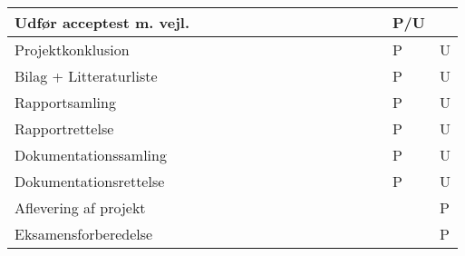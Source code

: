 \documentclass[landscape, 12pt, letterpaper]{article}
\begin{document}
\begin{table}[]
\begin{tabular}{|l|l|l|l|l|l|l|l|l|l|l|l|l|l|l|l|}
Udfør acceptest m. vejl.&    &    &    &    &    &    &    &    &    &    &    &    &    & P/U&    \\ \hline
Projektkonklusion       &    &    &    &    &    &    &    &    &    &    &    &    &    & P  &  U \\ \hline
Bilag + Litteraturliste &    &    &    &    &    &    &    &    &    &    &    &    &    &  P &  U \\ \hline
Rapportsamling          &    &    &    &    &    &    &    &    &    &    &    &    &    &  P &  U \\ \hline
Rapportrettelse         &    &    &    &    &    &    &    &    &    &    &    &    &    &  P &  U \\ \hline
Dokumentationssamling   &    &    &    &    &    &    &    &    &    &    &    &    &    &  P &  U \\ \hline
Dokumentationsrettelse  &    &    &    &    &    &    &    &    &    &    &    &    &    &  P &  U \\ \hline
Aflevering af projekt   &    &    &    &    &    &    &    &    &    &    &    &    &    &    &  P \\ \hline
Eksamensforberedelse    &    &    &    &    &    &    &    &    &    &    &    &    &    &    &  P \\ \hline

\end{tabular}
\end{table}
\end{document}
